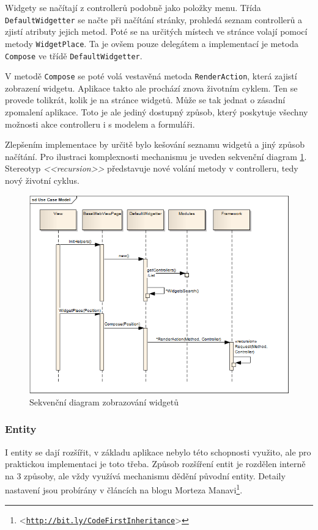 \documentclass[11pt,twoside,a4paper]{book}
\let\oldUrl\url
\renewcommand\url[1]{<\texttt{\oldUrl{#1}}>}
\begin{document}
Widgety se načítají z controllerů podobně jako položky menu. Třída \texttt{DefaultWidgetter} se načte při načítání stránky, prohledá seznam controllerů a zjistí atributy jejich metod. Poté se na určitých místech ve stránce volají pomocí metody \texttt{WidgetPlace}. Ta je ovšem pouze delegátem a implementací je metoda \texttt{Compose} ve třídě \texttt{DefaultWidgetter}.

V metodě \texttt{Compose} se poté volá vestavěná metoda \texttt{RenderAction}, která zajistí zobrazení widgetu. Aplikace takto ale prochází znova životním cyklem. Ten se provede tolikrát, kolik je na stránce widgetů. Může se tak jednat o zásadní zpomalení aplikace. Toto je ale jediný dostupný způsob, který poskytuje všechny možnosti akce controlleru i s modelem a formuláři.

Zlepšením implementace by určitě bylo kešování seznamu widgetů a jiný způsob načítání. Pro ilustraci komplexnosti mechanismu je uveden sekvenční diagram \ref{fig:widgety}. Stereotyp \textit{<<recursion>>} představuje nové volání metody v controlleru, tedy nový životní cyklus.

\begin{figure}[h!]
\begin{center}
\includegraphics[scale=0.71]{figures/widgety}
\caption{Sekvenční diagram zobrazování widgetů}
\label{fig:widgety}
\end{center}
\end{figure}

\subsubsection{Entity}
\label{subsec:pripojenientit}
I entity se dají rozšířit, v základu aplikace nebylo této schopnosti využito, ale pro praktickou implementaci je toto třeba. Způsob rozšíření entit je rozdělen interně na 3 způsoby, ale vždy využívá mechanismu dědění původní entity. Detaily nastavení jsou probírány v článcích na blogu Morteza Manavi\footnote{\url{http://bit.ly/CodeFirstInheritance}}.
\end{document}

